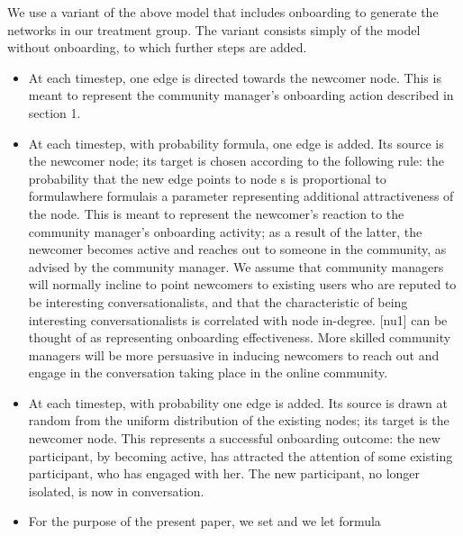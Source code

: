 We use a variant of the above model that includes onboarding to generate the networks in our treatment group. The variant consists simply of the model without onboarding, to which further steps are added.
\begin{itemize}
\item At each timestep, one edge is directed towards the newcomer node. This is meant to represent the community manager's onboarding action described in section 1. 
\item At each timestep, with probability formula, one edge is added. Its source is the newcomer node; its target is chosen according to the following rule: the probability that the new edge points to node s is proportional to formulawhere formulais a parameter representing additional attractiveness of the node. This is meant to represent the newcomer's reaction to the community manager's onboarding activity; as a result of the latter, the newcomer becomes active and reaches out to someone in the community, as advised by the community manager. We assume that community managers will normally incline to point newcomers to existing users who are reputed to be interesting conversationalists, and that the characteristic of being interesting conversationalists is correlated with node in-degree. [nu1] can be thought of as representing onboarding effectiveness. More skilled community managers will be more persuasive in inducing newcomers to reach out and engage in the conversation taking place in the online community.
\item At each timestep, with probability one edge is added. Its source is drawn at random from the uniform distribution of the existing nodes; its target is the newcomer node. This represents a successful onboarding outcome: the new participant, by becoming active, has attracted the attention of some existing participant, who has engaged with her. The new participant, no longer isolated, is now in conversation.
\item For the purpose of the present paper, we set and we let formula
\end{itemize}

